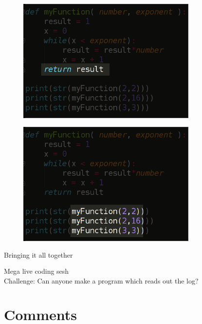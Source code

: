 \documentclass{beamer}
\begin{document}
\begin{frame}
\begin{figure}[h]
\includegraphics[width=0.8\textwidth]{myfunc5}
\end{figure}
\end{frame}

\begin{frame}
\begin{figure}[h]
\includegraphics[width=0.8\textwidth]{myfunc6}
\end{figure}
\end{frame}

\begin{frame}{Bringing it all together}

Mega live coding sesh\\
\pause
Challenge: Can anyone make a program which reads out the log?

\end{frame}

\section{Comments}
\end{document}

